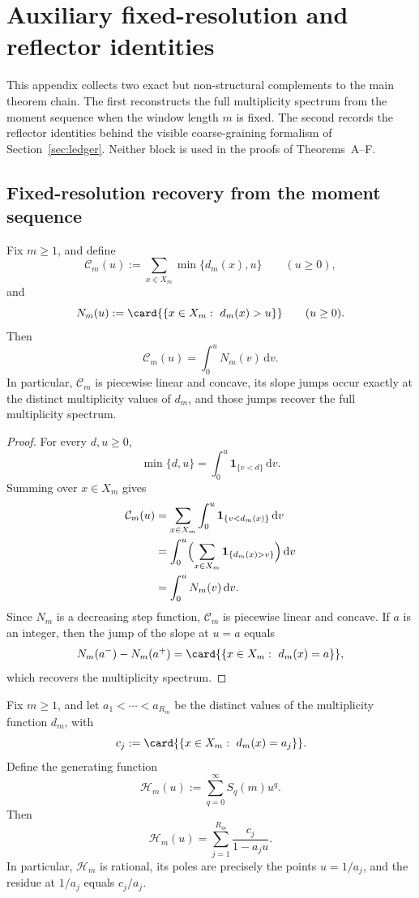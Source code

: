 \section{Auxiliary fixed-resolution and reflector identities}
\label{app:auxiliary}

This appendix collects two exact but non-structural complements to the main
theorem chain.  The first reconstructs the full multiplicity spectrum from the
moment sequence when the window length \(m\) is fixed.  The second records the
reflector identities behind the visible coarse-graining formalism of
Section~\ref{sec:ledger}.  Neither block is used in the proofs of
Theorems~A--F.

\subsection{Fixed-resolution recovery from the moment sequence}

\begin{theorem}
\label{thm:truncated-sum-curve}
Fix \(m\ge 1\), and define
\[
  \mathcal C_m(u):=\sum_{x\in X_m}\min\{d_m(x),u\}
  \qquad (u\ge 0),
\]
and
\[
  N_m(u):=\card{\{x\in X_m:\ d_m(x)>u\}}
  \qquad (u\ge 0).
\]
Then
\[
  \mathcal C_m(u)=\int_0^u N_m(v)\,\mathrm{d}v.
\]
In particular, \(\mathcal C_m\) is piecewise linear and concave, its slope
jumps occur exactly at the distinct multiplicity values of \(d_m\), and those
jumps recover the full multiplicity spectrum.
\end{theorem}

\begin{proof}
For every \(d,u\ge 0\),
\[
  \min\{d,u\}=\int_0^u \mathbf{1}_{\{v<d\}}\,\mathrm{d}v.
\]
Summing over \(x\in X_m\) gives
\begin{align*}
  \mathcal C_m(u)
  &=
  \sum_{x\in X_m}\int_0^u \mathbf{1}_{\{v<d_m(x)\}}\,\mathrm{d}v \\
  &=
  \int_0^u
  \Bigl(\sum_{x\in X_m}\mathbf{1}_{\{d_m(x)>v\}}\Bigr)\,\mathrm{d}v \\
  &=
  \int_0^u N_m(v)\,\mathrm{d}v.
\end{align*}
Since \(N_m\) is a decreasing step function, \(\mathcal C_m\) is piecewise
linear and concave.  If \(a\) is an integer, then the jump of the slope at
\(u=a\) equals
\[
  N_m(a^-)-N_m(a^+)
  =
  \card{\{x\in X_m:\ d_m(x)=a\}},
\]
which recovers the multiplicity spectrum.
\end{proof}

\begin{theorem}
\label{thm:fiber-resolvent}
Fix \(m\ge 1\), and let \(a_1<\cdots<a_{R_m}\) be the distinct values of the
multiplicity function \(d_m\), with
\[
  c_j:=\card{\{x\in X_m:\ d_m(x)=a_j\}}.
\]
Define the generating function
\[
  \mathcal H_m(u):=\sum_{q=0}^{\infty} S_q(m)u^q.
\]
Then
\[
  \mathcal H_m(u)=\sum_{j=1}^{R_m}\frac{c_j}{1-a_ju}.
\]
In particular, \(\mathcal H_m\) is rational, its poles are precisely the points
\(u=1/a_j\), and the residue at \(1/a_j\) equals \(c_j/a_j\).
\end{theorem}

